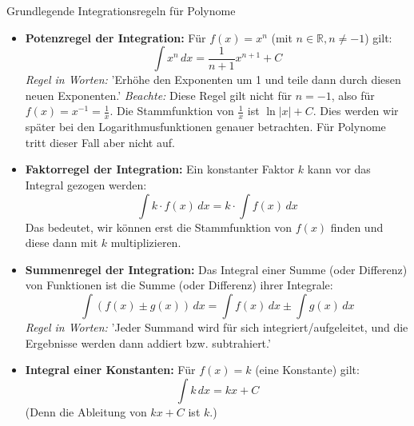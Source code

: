 \begin{merksatzumgebung}{Grundlegende Integrationsregeln für Polynome}
\begin{itemize}
    \item \textbf{Potenzregel der Integration:} Für $f(x) = x^n$ (mit $n \in \mathbb{R}, n \neq -1$) gilt:
    \[ \int x^n \,dx = \frac{1}{n+1}x^{n+1} + C \]
    \textit{Regel in Worten:} 'Erhöhe den Exponenten um 1 und teile dann durch diesen neuen Exponenten.'
    \textit{Beachte:} Diese Regel gilt nicht für $n=-1$, also für $f(x)=x^{-1}=\frac{1}{x}$. Die Stammfunktion von $\frac{1}{x}$ ist $\ln|x|+C$. Dies werden wir später bei den Logarithmusfunktionen genauer betrachten. Für Polynome tritt dieser Fall aber nicht auf.

    \item \textbf{Faktorregel der Integration:} Ein konstanter Faktor $k$ kann vor das Integral gezogen werden:
    \[ \int k \cdot f(x) \,dx = k \cdot \int f(x) \,dx \]
    Das bedeutet, wir können erst die Stammfunktion von $f(x)$ finden und diese dann mit $k$ multiplizieren.

    \item \textbf{Summenregel der Integration:} Das Integral einer Summe (oder Differenz) von Funktionen ist die Summe (oder Differenz) ihrer Integrale:
    \[ \int (f(x) \pm g(x)) \,dx = \int f(x) \,dx \pm \int g(x) \,dx \]
    \textit{Regel in Worten:} 'Jeder Summand wird für sich integriert/aufgeleitet, und die Ergebnisse werden dann addiert bzw. subtrahiert.'

    \item \textbf{Integral einer Konstanten:} Für $f(x)=k$ (eine Konstante) gilt:
    \[ \int k \,dx = kx + C \]
    (Denn die Ableitung von $kx+C$ ist $k$.)
\end{itemize}
\end{merksatzumgebung}

